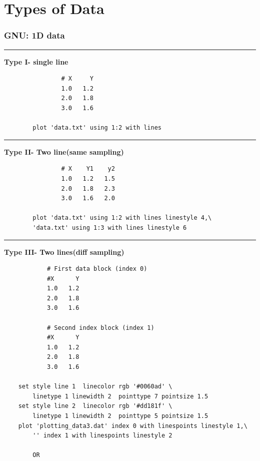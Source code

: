 \documentclass{beamer}
\begin{document}
	\section{Types of Data}	
	\begin{frame}
		\frametitle{GNU: 1D data}
		\scriptsize  \center 	\hrule 
		\vspace{.3cm}
		\textbf{Type I- single line	}
		\begin{Verbatim}
				# X     Y
				1.0   1.2
				2.0   1.8
				3.0   1.6	
				
		plot 'data.txt' using 1:2 with lines
		\end{Verbatim}
		\vspace{.3cm}
		\hrule 
		\vspace{.3cm}
		\textbf{Type II- Two line(same sampling)}
		\begin{Verbatim}
				# X    Y1    y2
				1.0   1.2	1.5
				2.0   1.8	2.3
				3.0   1.6	2.0	
				
		plot 'data.txt' using 1:2 with lines linestyle 4,\
		'data.txt' using 1:3 with lines linestyle 6
		\end{Verbatim}
		\vspace{2cm}
		\hrule 
		\vspace{.3cm}
		\textbf{Type III- Two lines(diff sampling)}
		\begin{Verbatim}
			# First data block (index 0)
			#X      Y
			1.0   1.2
			2.0   1.8
			3.0   1.6
			
			# Second index block (index 1)
			#X      Y
			1.0   1.2
			2.0   1.8
			3.0   1.6
			
	set style line 1  linecolor rgb '#0060ad' \
	    linetype 1 linewidth 2  pointtype 7 pointsize 1.5
	set style line 2  linecolor rgb '#dd181f' \
	    linetype 1 linewidth 2  pointtype 5 pointsize 1.5
	plot 'plotting_data3.dat' index 0 with linespoints linestyle 1,\
		'' index 1 with linespoints linestyle 2
		
		OR
		

\end{Verbatim}
\end{frame}
\end{document}
